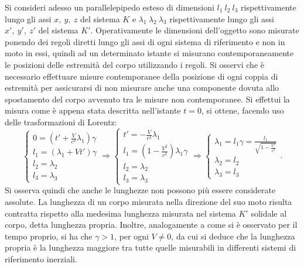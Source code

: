 Si consideri adesso un parallelepipedo esteso di dimensioni $l_1\ l_2\ l_3$ rispettivamente lungo gli assi $x,\ y,\ z$ del sistema $K$ e $\lambda_1\ \lambda_2\ \lambda_3$ rispettivamente lungo gli assi $x',\ y',\ z'$ del sistema $K'$. Operativamente le dimensioni dell'oggetto sono misurate ponendo dei regoli diretti lungo gli assi di ogni sistema di riferimento e non in moto in essi, quindi ad un determinato istante si misurano contemporaneamente le posizioni delle estremità del corpo utilizzando i regoli. Si osservi che è necessario effettuare misure contemporanee della posizione di ogni coppia di estremità per assicurarsi di non misurare anche una componente dovuta allo spostamento del corpo avvenuto tra le misure non contemporanee. Si effettui la misura come è appena stata descritta nell'istante $t=0$, si ottene, facendo uso delle trasformazioni di Lorentz: 
\begin{equation}
    \begin{cases}
        0=(t'+\frac{V}{c^2}\lambda_1)\gamma\\
        l_1=(\lambda_1+Vt')\gamma\\
        l_2=\lambda_2\\
        l_3=\lambda_3
    \end{cases}
    \Rightarrow
    \begin{cases}
        t'=-\frac{V}{c^2}\lambda_1\\
        l_1=(1-\frac{V^2}{c^2})\lambda_1\gamma\\
        l_2=\lambda_2\\
        l_3=\lambda_3
    \end{cases}
    \Rightarrow
    \begin{cases}
        \lambda_1=l_1\gamma=\frac{l_1}{\sqrt{1-\frac{V^2}{c^2}}}\\
        \lambda_2=l_2\\
        \lambda_3=l_3
    \end{cases}.
    \label{contrazioneLunghezze}
\end{equation}   
 Si osserva quindi che anche le lunghezze non possono più essere considerate assolute. La lunghezza di un corpo misurata nella direzione del suo moto risulta contratta rispetto alla medesima lunghezza misurata nel sistema $K'$ solidale al corpo, detta lunghezza propria. Inoltre, analogamente a come si è osservato per il tempo proprio, si ha che $\gamma > 1$, per ogni $V\neq0$, da cui si deduce che la lunghezza propria è la lunghezza maggiore tra tutte quelle misurabili in differenti sistemi di riferimento inerziali.\\
 
